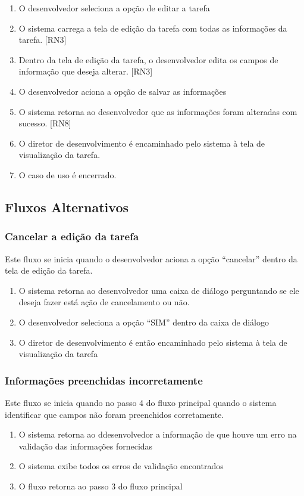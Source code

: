 \begin{enumerate}
  \item O desenvolvedor seleciona a opção de editar a tarefa
  \item O sistema carrega a tela de edição da tarefa com todas as informações da tarefa. [RN3]
  \item Dentro da tela de edição da tarefa, o desenvolvedor edita os campos de informação que deseja alterar. [RN3]
  \item O desenvolvedor aciona a opção de salvar as informações
  \item O sistema retorna ao desenvolvedor que as informações foram alteradas com sucesso. [RN8]
  \item O diretor de desenvolvimento é encaminhado pelo sistema à tela de visualização da tarefa.
  \item O caso de uso é encerrado.
\end{enumerate}

\subsection{Fluxos Alternativos}

\subsubsection{Cancelar a edição da tarefa}
Este fluxo se inicia quando o desenvolvedor aciona a opção “cancelar” dentro da tela de edição da tarefa.

\begin{enumerate}
  \item O sistema retorna ao desenvolvedor uma caixa de diálogo perguntando se ele deseja fazer está ação de cancelamento ou não.
  \item O desenvolvedor seleciona a opção “SIM” dentro da caixa de diálogo
  \item O diretor de desenvolvimento é então encaminhado pelo sistema à tela de visualização da tarefa
\end{enumerate}

\subsubsection{Informações preenchidas incorretamente}
Este fluxo se inicia quando no passo 4 do fluxo principal quando o sistema identificar que campos não foram preenchidos corretamente.

\begin{enumerate}
  \item O sistema retorna ao ddesenvolvedor a informação de que houve um erro na validação das informações fornecidas
  \item O sistema exibe todos os erros de validação encontrados
  \item O fluxo retorna ao passo 3 do fluxo principal
\end{enumerate}


